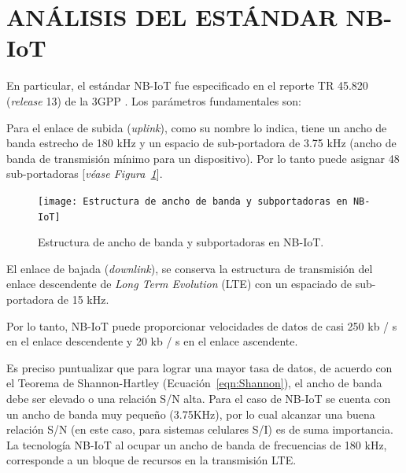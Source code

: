 
\section{ANÁLISIS DEL ESTÁNDAR NB-IoT} \label{NBIoT}

En particular, el estándar NB-IoT fue especificado en el reporte TR 45.820 (\textit{release} 13) de la 3GPP \parencite{3GPP2019}. Los parámetros fundamentales son:\newline

Para el enlace de subida (\textit{uplink}), como su nombre lo indica, tiene un ancho de banda estrecho de 180 kHz y un espacio de sub-portadora de 3.75 kHz (ancho de banda de transmisión mínimo para un dispositivo). Por lo tanto puede asignar 48 sub-portadoras [\textit{véase Figura~\ref{fig:NBIoT}}].

\begin{figure}[th]
\centering
\texttt{[image: Estructura de ancho de banda y subportadoras en NB-IoT]}
\decoRule
\caption[Estructura de ancho de banda y subportadoras en NB-IoT.]{Estructura de ancho de banda y subportadoras en NB-IoT.}
\label{fig:NBIoT}
\end{figure}

El enlace de bajada (\textit{downlink}), se conserva la estructura de transmisión del enlace descendente de \textit{Long Term Evolution} (LTE) con un espaciado de sub-portadora de 15 kHz.\newline

Por lo tanto, NB-IoT puede proporcionar velocidades de datos de casi 250 kb / s en el enlace descendente y 20 kb / s en el enlace ascendente.\newline

Es preciso puntualizar que para lograr una mayor tasa de datos, de acuerdo con el Teorema de Shannon-Hartley (Ecuación~\ref{eqn:Shannon}), el ancho de banda debe ser elevado o una relación S/N alta. Para el caso de NB-IoT se cuenta con un ancho de banda muy pequeño (3.75KHz), por lo cual alcanzar una buena relación S/N (en este caso, para sistemas celulares S/I) es de suma importancia.\\

La tecnología NB-IoT al ocupar un ancho de banda de frecuencias de 180 kHz, corresponde a un bloque de recursos en la transmisión LTE. 

